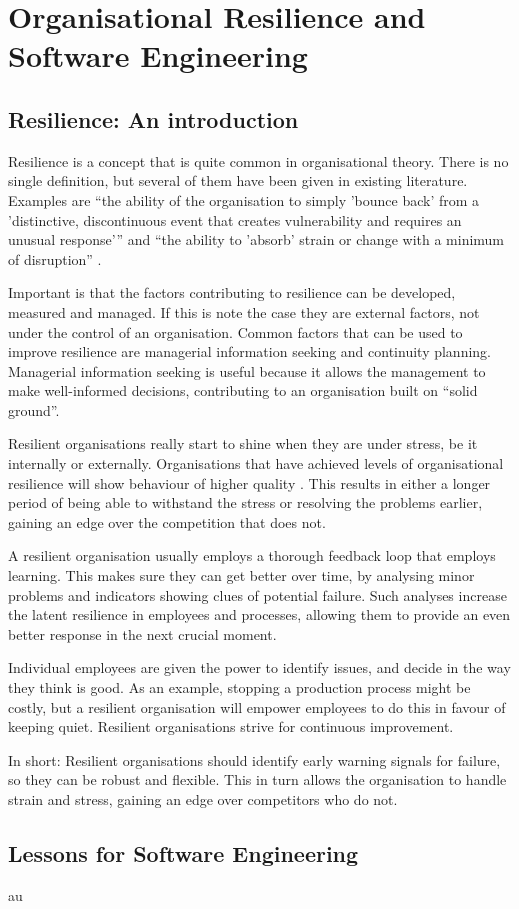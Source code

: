 \chapter{Organisational Resilience and Software Engineering}
\section{Resilience: An introduction}
Resilience is a concept that is quite common in organisational theory. 
There is no single definition, but several of them have been given in existing literature.
Examples are ``the ability of the organisation to simply 'bounce back' from a 'distinctive, discontinuous event that creates vulnerability and requires an unusual response'{''} \cite{JCCM:JCCM558} and ``the ability to 'absorb' strain or change with a minimum of disruption'' \cite{JCCM:JCCM558}.

Important is that the factors contributing to resilience can be developed, measured and managed.
If this is note the case they are external factors, not under the control of an organisation. 
Common factors that can be used to improve resilience are managerial information seeking and continuity planning.
Managerial information seeking is useful because it allows the management to make well-informed decisions, contributing to an organisation built on ``solid ground''.

Resilient organisations really start to shine when they are under stress, be it internally or externally. 
Organisations that have achieved levels of organisational resilience will show behaviour of higher quality \cite{vogus2007organizational}.
This results in either a longer period of being able to withstand the stress or resolving the problems earlier, gaining an edge over the competition that does not.

A resilient organisation usually employs a thorough feedback loop \cite{vogus2007organizational} that employs learning.
This makes sure they can get better over time, by analysing minor problems and indicators showing clues of potential failure. 
Such analyses increase the latent resilience in employees and processes, allowing them to provide an even better response in the next crucial moment.

Individual employees are given the power to identify issues, and decide in the way they think is good. 
As an example, stopping a production process might be costly, but a resilient organisation will empower employees to do this in favour of keeping quiet.
Resilient organisations strive for continuous improvement.

In short: Resilient organisations should identify early warning signals for failure, so they can be robust and flexible.
This in turn allows the organisation to handle strain and stress, gaining an edge over competitors who do not.

\section{Lessons for Software Engineering}
au
